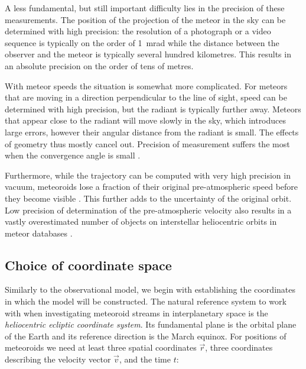    A less fundamental, but still important difficulty lies in the precision of these measurements.
    The position of the projection of the meteor in the sky can be determined with high precision:
    the resolution of a photograph or a video sequence is typically on the order of \SI{1}{\milli\radian}
    while the distance between the observer and the meteor is typically several hundred kilometres.
    This results in an absolute precision on the order of tens of metres.

    With meteor speeds the situation is somewhat more complicated.
    For meteors that are moving in a direction perpendicular to the line of sight, speed can be determined
    with high precision, but the radiant is typically further away.
    Meteors that appear close to the radiant will move slowly in the sky, which introduces large errors,
    however their angular distance from the radiant is small. The effects of geometry thus mostly cancel out.
    Precision of measurement suffers the most when the convergence angle is small \citep{ceplecha1987}.

    Furthermore, while the trajectory can be computed with very high precision in vacuum,
    meteoroids lose a fraction of their original pre-atmospheric speed before they become visible \citep{vida+2018}.
    This further adds to the uncertainty of the original orbit.
    Low precision of determination of the pre-atmospheric velocity also results in a vastly overestimated
    number of objects on interstellar heliocentric orbits in meteor databases \citep{hajdukovajr1994}.

    \subsection{Choice of coordinate space} \label{moc}
        Similarly to the observational model, we begin with establishing the coordinates in which the model will be constructed.
        The natural reference system to work with when investigating meteoroid streams in interplanetary space
        is the \emph{heliocentric ecliptic coordinate system}. Its fundamental plane is the orbital plane of the Earth
        and its reference direction is the March equinox.
        For positions of meteoroids we need at least three spatial coordinates $\vec{r}$,
        three coordinates describing the velocity vector $\vec{v}$, and the time $t$:

